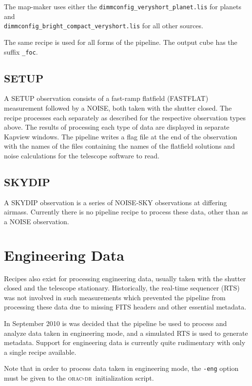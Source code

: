 \documentclass[twoside,11pt]{article}
\newcommand{\xlabel}[1]{}
\renewcommand{\_}{\texttt{\symbol{95}}}
\newcommand{\oracdr}{\textsc{orac-dr}}
\begin{document}
The map-maker uses either the \verb+dimmconfig_veryshort_planet.lis+
for planets and \\ \verb+dimmconfig_bright_compact_veryshort.lis+ for
all other sources.

The same recipe is used for all forms of the pipeline. The output cube
has the suffix \verb+_foc+.

\subsection{SETUP}

A SETUP observation consists of a fast-ramp flatfield (FASTFLAT)
measurement followed by a NOISE, both taken with the shutter
closed. The recipe processes each separately as described for the
respective observation types above. The results of processing each
type of data are displayed in separate Kapview windows. The pipeline
writes a flag file at the end of the observation with the names of the
files containing the names of the flatfield solutions and noise
calculations for the telescope software to read.

\subsection{SKYDIP}

A SKYDIP observation is a series of NOISE-SKY observations at
differing airmass. Currently there is no pipeline recipe to process
these data, other than as a NOISE observation.


\section{\xlabel{engineering}Engineering Data\label{se:eng}}

Recipes also exist for processing engineering data, usually taken with
the shutter closed and the telescope stationary. Historically, the
real-time sequencer (RTS) was not involved in such measurements which
prevented the pipeline from processing these data due to missing FITS
headers and other essential metadata.

In September 2010 is was decided that the pipeline be used to process
and analyze data taken in engineering mode, and a simulated RTS is
used to generate metadata. Support for engineering data is currently
quite rudimentary with only a single recipe available.

Note that in order to process data taken in engineering mode, the
\verb+-eng+ option must be given to the \oracdr\ initialization
script.
\end{document}
